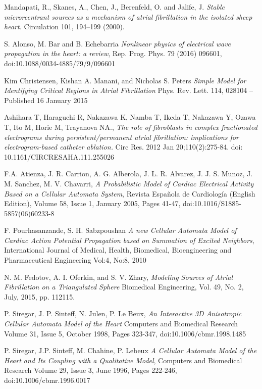 \documentclass[twocolumn]{article}
\begin{document}
\begin{thebibliography}{7}
Mandapati, R., Skanes, A., Chen, J., Berenfeld, O. and  Jalife, J. 
\emph{Stable microreentrant sources as a mechanism of atrial fibrillation in the isolated sheep heart.}
Circulation 101, 194–199 (2000). 

S. Alonso, M. Bar and B. Echebarria
\emph{Nonlinear physics of electrical wave
propagation in the heart: a review},
Rep. Prog. Phys. 79 (2016) 096601, 
doi:10.1088/0034-4885/79/9/096601

Kim Christensen, Kishan A. Manani, and Nicholas S. Peters
\emph{Simple Model for Identifying Critical Regions in Atrial Fibrillation}
Phys. Rev. Lett. 114, 028104 – Published 16 January 2015

Ashihara T, Haraguchi R, Nakazawa K, Namba T, Ikeda T, Nakazawa Y, Ozawa T, Ito M, Horie M, Trayanova NA., 
\emph{The role of fibroblasts in complex fractionated electrograms during persistent/permanent atrial fibrillation: implications for electrogram-based catheter ablation.}
Circ Res. 2012 Jan 20;110(2):275-84. doi: 10.1161/CIRCRESAHA.111.255026

F.A. Atienza, J. R. Carrion, A. G. Alberola, J. L. R. Alvarez, J. J. S. Munoz, J. M. Sanchez, M. V. Chavarri,
\emph{A Probabilistic Model of Cardiac Electrical Activity Based on a Cellular Automata System},
Revista Española de Cardiología (English Edition), Volume 58, Issue 1, January 2005, Pages 41-47,
doi:10.1016/S1885-5857(06)60233-8

F. Pourhasanzande, S. H. Sabzpoushan
\emph{A new Cellular Automata Model of Cardiac
Action Potential Propagation based on
Summation of Excited Neighbors}, 
International Journal of Medical, Health, Biomedical, Bioengineering and Pharmaceutical Engineering Vol:4, No:8, 2010  

N. M. Fedotov,  A. I. Oferkin, and S. V. Zhary,
\emph{Modeling Sources of Atrial Fibrillation on a Triangulated Sphere}
Biomedical Engineering, Vol. 49, No. 2, July, 2015, pp. 112115. 

P. Siregar, J. P. Sinteff, N. Julen, P. Le Beux,
\emph{An Interactive 3D Anisotropic Cellular Automata Model of the Heart}
Computers and Biomedical Research
Volume 31, Issue 5, October 1998, Pages 323-347, 
doi:10.1006/cbmr.1998.1485

P. Siregar, J.P. Sinteff, M. Chahine, P. Lebeux
\emph{A Cellular Automata Model of the Heart and Its Coupling with a Qualitative Model}, 
Computers and Biomedical Research
Volume 29, Issue 3, June 1996, Pages 222-246,
doi:10.1006/cbmr.1996.0017


\end{thebibliography}
\end{document}
